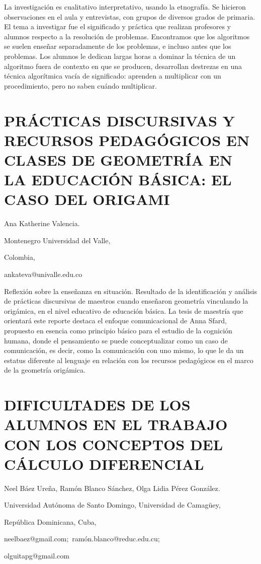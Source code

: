 La investigación es cualitativo interpretativo, usando la etnografía.
Se hicieron observaciones en el aula y entrevistas, con grupos de
diversos grados de primaria. El tema a investigar fue el significado
y práctica que realizan profesores y alumnos respecto a la resolución
de problemas. Encontramos que los algoritmos se suelen enseñar separadamente
de los problemas, e incluso antes que los problemas. Los alumnos le
dedican largas horas a dominar la técnica de un algoritmo fuera de
contexto en que se producen, desarrollan destrezas en una técnica
algorítmica vacía de significado: aprenden a multiplicar con un procedimiento,
pero no saben cuándo multiplicar.


\section{PRÁCTICAS DISCURSIVAS Y RECURSOS PEDAGÓGICOS EN CLASES DE GEOMETRÍA
EN LA EDUCACIÓN BÁSICA: EL CASO DEL ORIGAMI}

\begin{datos}

Ana Katherine Valencia.

Montenegro Universidad del Valle,

Colombia,

ankateva@univalle.edu.co 

\end{datos}

Reflexión sobre la enseñanza en situación. Resultado de la identificación
y análisis de prácticas discursivas de maestros cuando enseñaron geometría
vinculando la origámica, en el nivel educativo de educación básica.
La tesis de maestría que orientará este reporte destaca el enfoque
comunicacional de Anna Sfard, propuesto en esencia como principio
básico para el estudio de la cognición humana, donde el pensamiento
se puede conceptualizar como un caso de comunicación, es decir, como
la comunicación con uno mismo, lo que le da un estatus diferente al
lenguaje en relación con los recursos pedagógicos en el marco de la
geometría origámica. 


\section{DIFICULTADES DE LOS ALUMNOS EN EL TRABAJO CON LOS CONCEPTOS DEL CÁLCULO
DIFERENCIAL}

\begin{datos}

Neel Báez Ureña, Ramón Blanco Sánchez, Olga Lidia Pérez González.

Universidad Autónoma de Santo Domingo, Universidad de Camagüey,

República Dominicana, Cuba,

neelbaez@gmail.com$;$ ramón.blanco@reduc.edu.cu;

olguitapg@gmail.com 

\end{datos}

